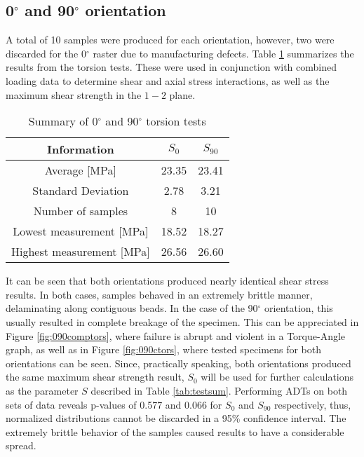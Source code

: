 \documentclass[main.tex]{subfiles}
\begin{document}
\pagebreak
\subsection{0$^\circ$ and 90$^\circ$ orientation} \label{ssec:090r}

A total of 10 samples were produced for each orientation, however, two were discarded for the 0$^\circ$ raster due to manufacturing defects. Table \ref{tab:tors090r} summarizes the results from the torsion tests. These were used in conjunction with combined loading data to determine shear and axial stress interactions, as well as the maximum shear strength in the $1-2$ plane.

\begin{table} [h]
	\centering
	\caption{Summary of 0$^\circ$ and 90$^\circ$ torsion tests}
\begin{tabular}{ c| c c } 
	\toprule
	\textbf{Information} & $S_{0}$ & $S_{90}$\\
	\midrule
	Average [MPa] &23.35  & 23.41\\
	Standard Deviation &2.78 & 3.21\\
	Number of samples &8  & 10\\
	Lowest measurement [MPa] &18.52  & 18.27\\
	Highest measurement [MPa] &26.56 & 26.60\\
	\bottomrule
\end{tabular}
\label{tab:tors090r}
\end{table}


It can be seen that both orientations produced nearly identical shear stress results. In both cases, samples behaved in an extremely brittle manner, delaminating along contiguous beads. In the case of the 90$^\circ$ orientation, this usually resulted in complete breakage of the specimen. This can be appreciated in Figure \ref{fig:090comptors}, where failure is abrupt and violent in a Torque-Angle graph, as well as in Figure \ref{fig:090ctors}, where tested specimens for both orientations can be seen. Since, practically speaking, both orientations produced the same maximum shear strength result, $S_0$ will be used for further calculations as the parameter $S$ described in Table \ref{tab:testsum}. Performing ADTs on both sets of data reveals p-values of 0.577 and 0.066 for $S_0$ and $S_{90}$ respectively, thus, normalized distributions cannot be discarded in a 95\% confidence interval. The extremely brittle behavior of the samples caused results to have a considerable spread.
\end{document}
